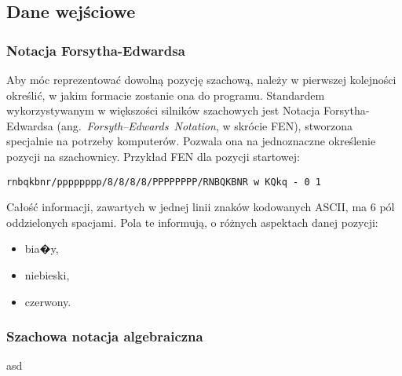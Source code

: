 \subsection{Dane wejściowe}
\label{subsec:dane-wejsciowe}

\subsubsection{Notacja Forsytha-Edwardsa}

Aby móc reprezentować dowolną pozycję szachową, należy w pierwszej kolejności określić, w jakim formacie zostanie ona do programu.
Standardem wykorzystywanym w większości silników szachowych jest Notacja Forsytha-Edwardsa (ang.~\emph{Forsyth–Edwards~Notation}, w skrócie FEN), stworzona specjalnie na potrzeby komputerów.
Pozwala ona na jednoznaczne określenie pozycji na szachownicy.
Przykład FEN dla pozycji startowej:

\vspace{5mm}
\centerline{
    \lstset{basicstyle=\ttfamily}\lstinline{rnbqkbnr/pppppppp/8/8/8/8/PPPPPPPP/RNBQKBNR w KQkq - 0 1}
}
\vspace{5mm}

Całość informacji, zawartych w jednej linii znaków kodowanych ASCII, ma 6 pól oddzielonych spacjami.
Pola te informują, o różnych aspektach danej pozycji:

\begin{itemize}
    \item bia�y,
    \item niebieski,
    \item czerwony.
\end{itemize}

\subsubsection{Szachowa notacja algebraiczna}
asd